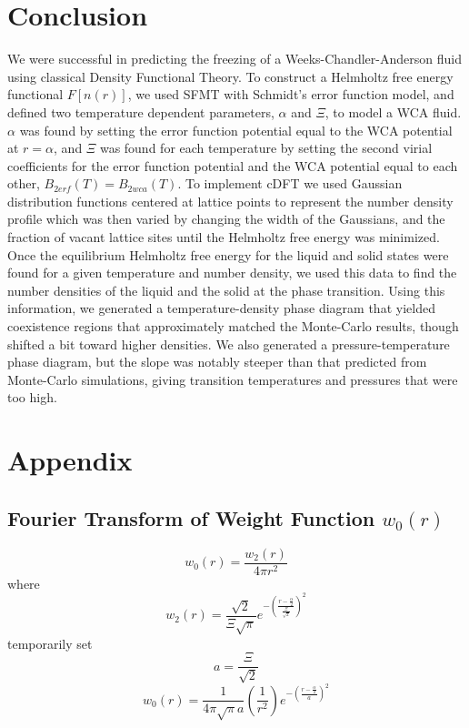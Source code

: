 \documentclass[double,12pt]{beavtex}
\begin{document}
\chapter{Conclusion}
We were successful in predicting the freezing of a Weeks-Chandler-Anderson 
fluid using classical Density Functional Theory. To construct a Helmholtz 
free energy functional $F[n(r)]$, we used SFMT with Schmidt's error 
function model, and defined two temperature dependent parameters, $\alpha$ 
and $\Xi$, to model a WCA fluid. 
$\alpha$ was found by setting the error function potential equal to the 
WCA potential at $r=\alpha$, and $\Xi$ was found for each temperature by 
setting the second virial coefficients for the error function potential 
and the WCA potential equal to each other, $B_{2erf}(T)=B_{2wca}(T)$.
To implement cDFT we used Gaussian distribution functions centered at 
lattice points to represent the number density profile which was then varied
by changing the width of the Gaussians, and the fraction of vacant lattice
sites until the Helmholtz free energy was minimized. Once the equilibrium 
Helmholtz free energy for the liquid and solid states were found for a given
temperature and number density, 
we used this data 
to find the number densities of the liquid and the solid at the phase transition.
Using this information, we generated a temperature-density 
phase diagram that yielded coexistence regions that approximately 
matched the Monte-Carlo
results, though shifted a bit toward higher densities. 
We also generated a pressure-temperature
phase diagram, but the slope was notably steeper than that
predicted from Monte-Carlo simulations, giving transition 
temperatures and pressures that were too high. 



\backmatter

\chapter{Appendix}

\section{Fourier Transform of Weight Function $w_0(r)$}
\begin{equation}{w_0(r)=\frac{w_2(r)}{4{\pi}r^2}}\end{equation}
where
\begin{equation}{w_2(r)=\frac{\sqrt{2}}{\Xi\sqrt{\pi}}e^{-\left(\frac{r-\frac{\alpha}{2}}{\frac{\Xi}{\sqrt{2}}}\right)^2}}\end{equation}
temporarily set 
\begin{equation}{a=\frac{\Xi}{\sqrt{2}}}\end{equation}
\begin{equation}{w_0(r)=\frac{1}{4{\pi}\sqrt{\pi}a}\left(\frac{1}{r^2}\right)e^{-\left(\frac{r-\frac{\alpha}{2}}{a}\right)^2}}\end{equation}
\end{document}
